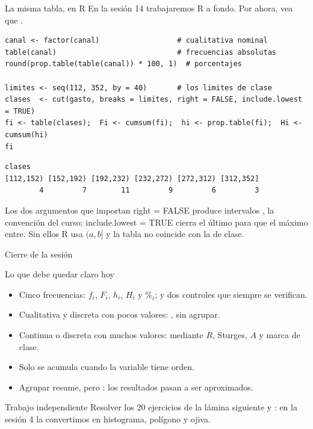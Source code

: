 \documentclass[aspectratio=169,10pt]{beamer}
\newcommand{\fx}[1]{{\ttfamily\color{uniAzul}#1}}
\begin{document}
\begin{frame}[fragile]{La misma tabla, en R}
  \scriptsize
  En la sesión 14 trabajaremos R a fondo. Por ahora, vea que
  .
\begin{lstlisting}[style=Rmini]
canal <- factor(canal)                  # cualitativa nominal
table(canal)                            # frecuencias absolutas
round(prop.table(table(canal)) * 100, 1)  # porcentajes

limites <- seq(112, 352, by = 40)       # los limites de clase
clases  <- cut(gasto, breaks = limites, right = FALSE, include.lowest = TRUE)
fi <- table(clases);  Fi <- cumsum(fi);  hi <- prop.table(fi);  Hi <- cumsum(hi)
fi
\end{lstlisting}
\begin{lstlisting}[style=Rout]
clases
[112,152) [152,192) [192,232) [232,272) [272,312) [312,352]
        4         7        11         9         6         3
\end{lstlisting}

  \vspace{-0.1cm}
  \begin{alertblock}{Los dos argumentos que importan}
    \tiny
    \fx{right = FALSE} produce intervalos \destacar{$[a,b)$}, la convención del
    curso; \fx{include.lowest = TRUE} cierra el último para que el máximo entre.
    Sin ellos R usa $(a,b]$ y la tabla no coincide con la de clase.
  \end{alertblock}
\end{frame}

\begin{frame}{Cierre de la sesión}
  \begin{block}{Lo que debe quedar claro hoy}
    \scriptsize
    \begin{itemize}\setlength{\itemsep}{0.02cm}
      \item Cinco frecuencias: $f_i$, $F_i$, $h_i$, $H_i$ y $\%_i$; y dos
            controles que siempre se verifican.
      \item Cualitativa y discreta con pocos valores: , sin agrupar.
      \item Continua o discreta con muchos valores: 
            mediante $R$, Sturges, $A$ y marca de clase.
      \item Solo se acumula cuando la variable tiene orden.
      \item Agrupar resume, pero : los resultados
            pasan a ser aproximados.
    \end{itemize}
  \end{block}

  \vspace{0.1cm}
  \begin{alertblock}{Trabajo independiente}
    \scriptsize
    Resolver los 20 ejercicios de la lámina siguiente y : en la sesión 4 la
    convertimos en histograma, polígono y ojiva.
  \end{alertblock}
\end{frame}
\end{document}
